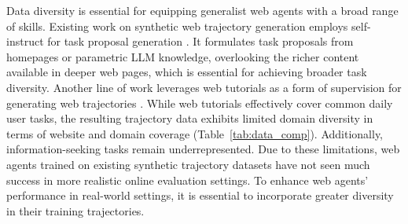 Data diversity is essential for equipping generalist web agents with a broad range of skills.
Existing work on synthetic web trajectory generation employs self-instruct for task proposal generation \cite{he2024openwebvoyager}.
It formulates task proposals from homepages or parametric LLM knowledge, overlooking the richer content available in deeper web pages, which is essential for achieving broader task diversity.
Another line of work leverages web tutorials as a form of supervision for generating web trajectories \cite{Ou2024SynatraTI, xu2024agenttrek}.
While web tutorials effectively cover common daily user tasks, the resulting trajectory data exhibits limited domain diversity in terms of website and domain coverage (Table~\ref{tab:data_comp}).
Additionally, information-seeking tasks remain underrepresented.
Due to these limitations, web agents trained on existing synthetic trajectory datasets have not seen much success in more realistic online evaluation settings.
To enhance web agents' performance in real-world settings, it is essential to incorporate greater diversity in their training trajectories.




